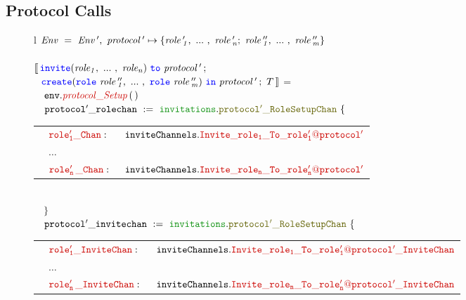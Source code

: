 \documentclass[12pt,twoside]{report}
\begin{document}
\subsection{Protocol Calls}\label{protocol-calls-impl}

\begin{figure}[!h]
    \begin{center}
        \begin{tabular}{l}
            $\mathit{Env\ =\ Env\,',\ protocol\,' \mapsto \{\roles{role\,'}{n};\ \roles{role\,''}{m}\}}$\\\\

            $\llbracket\,\invite(\roles{role}{n})\ \scrto\ \mathit{protocol\,'}\,;$\\[1.5pt] 
            $\ \,\,\create(\rolessig{role\,''}{m})\ \scrin\ \mathit{protocol\,'}\,;\ T\,\rrbracket$ =\\[10pt]
            
            {\footnotesize
            $\quad \methodcall{\envparam}{protocol\_Setup}\,\emptyparams$}\\[3pt]

            {\footnotesize
            $\quad \varname{protocol'\_rolechan}\ :=\ \pkgstructaccess{invitations}{protocol'\_RoleSetupChan}\ \{$}\\[3pt]
            {\footnotesize
            \quad \begin{tabular}{lll}
                \indent & $\structfield{role'_1\_Chan}:$\ &$\structaccess{\invitechannels}{Invite\_role_1\_To\_\localprotocol{role'_1}{protocol'}}$\\
                \indent & $\dots$ & \\
                \indent & $\structfield{role'_n\,\_Chan}:$\ &$\structaccess{\invitechannels}{Invite\_role_n\_To\_\localprotocol{role'_n}{protocol'}}$
            \end{tabular}}\\

            {\footnotesize
            $\quad \}$}\\[3pt]

            {\footnotesize
            $\quad \varname{protocol'\_invitechan}\ :=\ \pkgstructaccess{invitations}{protocol'\_RoleSetupChan}\ \{$}\\[3pt]
           
            {\footnotesize
            \quad \begin{tabular}{lll}
                \indent & $\structfield{role'_1\_InviteChan}:$\ &$\structaccess{\invitechannels}{Invite\_role_1\_To\_\localprotocol{role'_1}{protocol'}\_InviteChan}$\\
                \indent & $\dots$ & \\
                \indent & $\structfield{role'_n\,\_InviteChan}:$\ &$\structaccess{\invitechannels}{Invite\_role_n\_To\_\localprotocol{role'_n}{protocol'}\_InviteChan}$
            \end{tabular}}\\


\end{tabular}
\end{center}
\end{figure}
\end{document}
